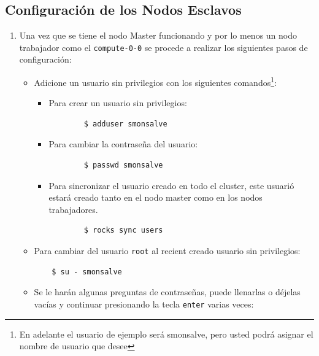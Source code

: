 \subsection{Configuración de los Nodos Esclavos}

\begin{enumerate}
	\item Una vez que se tiene el nodo Master funcionando y por lo menos un nodo trabajador como el \texttt{compute-0-0} se procede a realizar los siguientes pasos de configuración:

	\begin{itemize}
	\item Adicione un usuario sin privilegios con los siguientes comandos\footnote{En adelante el usuario de ejemplo será smonsalve, pero usted podrá asignar el nombre de usuario que desee}:

	\begin{itemize}
		\item  Para crear un usuario sin privilegios: 


		\begin{verbatim}
		$ adduser smonsalve
		\end{verbatim}
		
		\item Para cambiar la contraseña del usuario:


		\begin{verbatim}
		$ passwd smonsalve
		\end{verbatim}
		

		\item Para sincronizar el usuario creado en todo el cluster, este usuarió estará creado tanto en el nodo master como en los nodos trabajadores.


		\begin{verbatim}
		$ rocks sync users
		\end{verbatim}
		
	\end{itemize}

	\item Para cambiar del usuario \texttt{root} al recient creado usuario sin privilegios: 

	\begin{verbatim}
	$ su - smonsalve
	\end{verbatim}

	\item Se le harán algunas preguntas de contraseñas, puede llenarlas o déjelas vacías y continuar presionando la tecla \texttt{enter} varias veces: 

	\end{itemize}
	
\end{enumerate}

